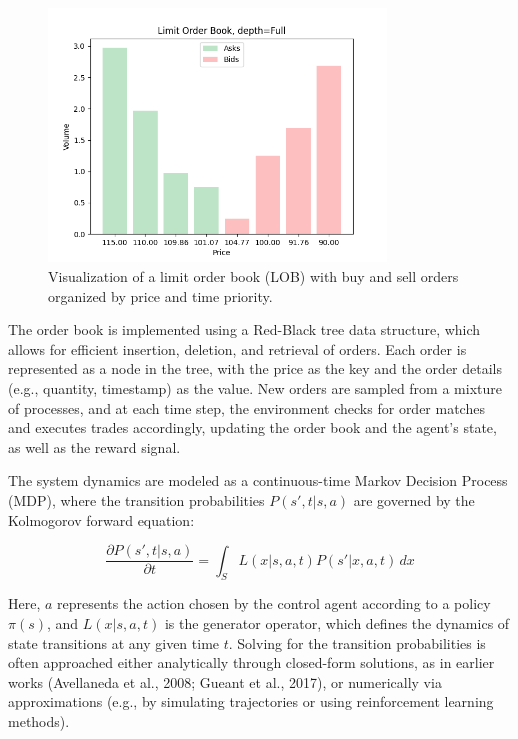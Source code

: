 \documentclass[11pt]{article}
\begin{document}
    \begin{figure}[htb]
        \centering
        \includegraphics[width=0.8\textwidth]{img/lob}
        \caption{Visualization of a limit order book (LOB) with buy and sell orders organized by price and time priority.}
        \label{fig:lob}
    \end{figure}

    The order book is implemented using a Red-Black tree data structure, which allows for efficient insertion, deletion, and retrieval of orders.
    Each order is represented as a node in the tree, with the price as the key and the order details (e.g., quantity, timestamp) as the value.
    New orders are sampled from a mixture of processes, and at each time step, the environment checks for order matches and executes trades accordingly,
    updating the order book and the agent's state, as well as the reward signal.

    The system dynamics are modeled as a continuous-time Markov Decision Process (MDP), where the transition probabilities
    \( P(s', t|s, a) \) are governed by the Kolmogorov forward equation:

    \[
        \frac{\partial P(s', t|s, a)}{\partial t} = \int_S L(x|s, a, t) P(s'|x, a, t) \, dx
    \]

    Here, \( a \) represents the action chosen by the control agent according to a policy \( \pi(s) \), and \( L(x|s, a, t) \) is the generator operator,
    which defines the dynamics of state transitions at any given time \( t \).
    Solving for the transition probabilities is often approached either analytically through closed-form solutions,
    as in earlier works (Avellaneda et al., 2008; Gueant et al., 2017),
    or numerically via approximations (e.g., by simulating trajectories or using reinforcement learning methods).
\end{document}
